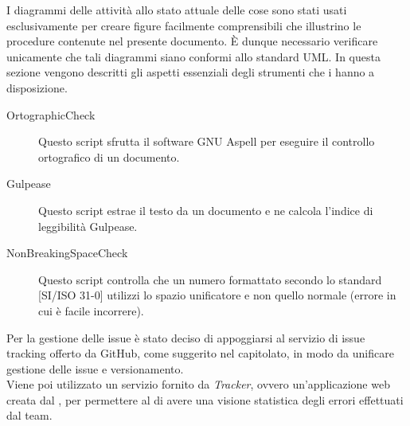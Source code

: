 				I diagrammi delle attività allo stato attuale delle cose sono stati usati esclusivamente per creare figure facilmente comprensibili che illustrino le procedure contenute nel presente documento. È dunque necessario verificare unicamente che tali diagrammi siano conformi allo standard UML.
	\label{sec:strumentiverifica}
			In questa sezione vengono descritti gli aspetti essenziali degli strumenti che i  hanno a disposizione.
			\begin{description}
				\item[OrtographicCheck] Questo script sfrutta il software GNU Aspell per eseguire il controllo ortografico di un documento.
				\item[Gulpease] Questo script estrae il testo da un documento e ne calcola l'indice di leggibilità Gulpease.
				\item[NonBreakingSpaceCheck] Questo script controlla che un numero formattato secondo lo standard [SI/ISO 31-0] utilizzi lo spazio unificatore e non quello normale (errore in cui è facile incorrere).
			\end{description}

			Per la gestione delle issue è stato deciso di appoggiarsi al servizio di issue tracking offerto da GitHub, come suggerito nel capitolato, in modo da unificare gestione delle issue e versionamento. \\
			Viene poi utilizzato un servizio fornito da \textit{Tracker}, ovvero un'applicazione web creata dal \groupname, per permettere al  di avere una visione statistica degli errori effettuati dal team.
